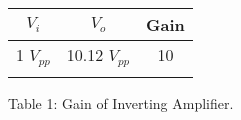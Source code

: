 \begin{center}
\begin{tabular}[.5cm]{c c c}
\toprule
\toprule
\hspace{60pt} $V_{i}$ \hspace{60pt} & \hspace{60pt} $V_{o}$ \hspace{60pt} & \hspace{60pt}  {\bfseries Gain} \hspace{60pt}  \\
\midrule
\midrule
1 $V_{pp}$ & 10.12 $V_{pp}$ & 10 \\
\bottomrule
\linebreak
\end{tabular}
\linebreak Table 1: Gain of Inverting Amplifier.
\end{center}

\pagebreak